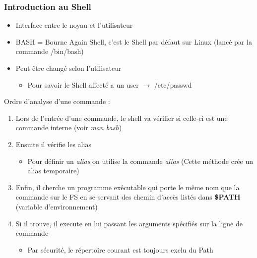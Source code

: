 \documentclass[a4paper]{article}
\begin{document}
      \subsubsection{Introduction au Shell}
      \begin{itemize}[label=\textbullet, font=\Large]
        \item Interface entre le noyau et l'utilisateur
        \item BASH = Bourne Again Shell, c'est le Shell par défaut sur Linux (lancé par la commande /bin/bash)
        \item Peut être changé selon l'utilisateur
        \begin{itemize}[label=, font=\scriptsize]
          \item Pour savoir le Shell affecté a un user $\rightarrow$ /etc/passwd\\[0.2cm]
        \end{itemize}
    \end{itemize}
    Ordre d'analyse d'une commande :
    \begin{enumerate}
      \item Lors de l'entrée d'une commande, le shell va vérifier si celle-ci est une commande interne (voir \emph{man bash})
      \item Ensuite il vérifie les alias
      \begin{itemize}[label=, font=\scriptsize]
        \item Pour définir un \emph{alias} on utilise la commande \emph{alias} (Cette méthode crée un alias temporaire)
      \end{itemize}
      \item Enfin, il cherche un programme exécutable qui porte le même nom que la commande sur le FS en se servant des chemin d'accès listés dans \textbf{\$PATH}
      (variable d'environnement)
      \item Si il trouve, il execute en lui passant les arguments spécifiés sur la ligne de commande
      \begin{itemize}[label=, font=\scriptsize]
        \item Par sécurité, le répertoire courant est toujours exclu du Path
      \end{itemize}
    \end{enumerate}
\end{document}
